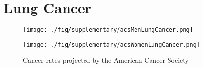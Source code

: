 \section*{Lung Cancer}

\begin{figure}
  \vspace*{\fill}
  \centering
  \texttt{[image: ./fig/supplementary/acsMenLungCancer.png]}
  \label{fig:acsMen}\par\vfill
  \texttt{[image: ./fig/supplementary/acsWomenLungCancer.png]}
  \caption{Cancer rates projected by the American Cancer Society\cite{acs2015}}
  \label{fig:acsWomen}
\end{figure}

